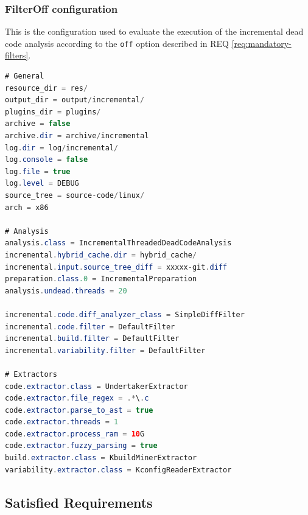 \documentclass[a4paper]{article}
\begin{document}
\clearpage

\subsubsection{FilterOff configuration}

This is the configuration used to evaluate the execution of the incremental dead code analysis according to the \texttt{off} option described in  REQ \ref{req:mandatory-filters}.

\begin{lstlisting}[language=java]
# General
resource_dir = res/
output_dir = output/incremental/
plugins_dir = plugins/
archive = false
archive.dir = archive/incremental
log.dir = log/incremental/
log.console = false
log.file = true
log.level = DEBUG
source_tree = source-code/linux/
arch = x86

# Analysis  
analysis.class = IncrementalThreadedDeadCodeAnalysis
incremental.hybrid_cache.dir = hybrid_cache/
incremental.input.source_tree_diff = xxxxx-git.diff
preparation.class.0 = IncrementalPreparation
analysis.undead.threads = 20

incremental.code.diff_analyzer_class = SimpleDiffFilter
incremental.code.filter = DefaultFilter
incremental.build.filter = DefaultFilter
incremental.variability.filter = DefaultFilter

# Extractors  
code.extractor.class = UndertakerExtractor
code.extractor.file_regex = .*\.c
code.extractor.parse_to_ast = true
code.extractor.threads = 1
code.extractor.process_ram = 10G
code.extractor.fuzzy_parsing = true
build.extractor.class = KbuildMinerExtractor
variability.extractor.class = KconfigReaderExtractor
\end{lstlisting}

\clearpage

\subsection{Satisfied Requirements}
\end{document}
